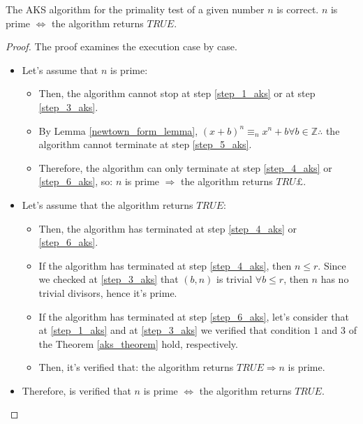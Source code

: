 \begin{theorem}
    The AKS algorithm for the primality test of a given number $n$ is correct.\newline
    $n$ is prime $\iff$ the algorithm returns $TRUE$.
\end{theorem}
\begin{proof}
    The proof examines the execution case by case.\newline
    \begin{itemize}
        \item Let's assume that $n$ is prime:
        \begin{itemize}
            \item Then, the algorithm cannot stop at step \ref{step_1_aks} or at step \ref{step_3_aks}.
            \item By Lemma \ref{newtown_form_lemma}, $ (x + b)^{n} \equiv_{n} x^{n} + b \forall b \in \mathbb{Z} \therefore$ the algorithm cannot terminate at step \ref{step_5_aks}.
            \item Therefore, the algorithm can only terminate at step \ref{step_4_aks} or \ref{step_6_aks}, so: $n$ is prime $\Rightarrow$ the algorithm returns $TRU£$.
        \end{itemize}
        \item Let's assume that the algorithm returns $TRUE$:
        \begin{itemize}
            \item Then, the algorithm has terminated at step \ref{step_4_aks} or \ref{step_6_aks}.
            \item If the algorithm has terminated at step \ref{step_4_aks}, then $n \leq r$. Since we checked at \ref{step_3_aks} that $(b,n)$ is trivial $\forall b \leq r$, then $n$ has no trivial divisors, hence it's prime.
            \item If the algorithm has terminated at step \ref{step_6_aks}, let's consider that at \ref{step_1_aks} and at \ref{step_3_aks} we verified that condition $1$ and $3$ of the Theorem \ref{aks_theorem} hold, respectively.
            \item Then, it's verified that: the algorithm returns $TRUE \Rightarrow n$ is prime.
        \end{itemize}
        \item Therefore, is verified that $n$ is prime $\iff$ the algorithm returns $TRUE$.
    \end{itemize}
\end{proof}
